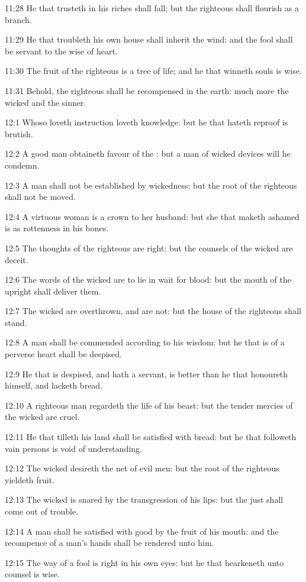 11:28 He that trusteth in his riches shall fall; but the righteous
shall flourish as a branch.

11:29 He that troubleth his own house shall inherit the wind: and the
fool shall be servant to the wise of heart.

11:30 The fruit of the righteous is a tree of life; and he that
winneth souls is wise.

11:31 Behold, the righteous shall be recompensed in the earth: much
more the wicked and the sinner.

12:1 Whoso loveth instruction loveth knowledge: but he that hateth
reproof is brutish.

12:2 A good man obtaineth favour of the \LORD: but a man of wicked
devices will he condemn.

12:3 A man shall not be established by wickedness: but the root of the
righteous shall not be moved.

12:4 A virtuous woman is a crown to her husband: but she that maketh
ashamed is as rottenness in his bones.

12:5 The thoughts of the righteous are right: but the counsels of the
wicked are deceit.

12:6 The words of the wicked are to lie in wait for blood: but the
mouth of the upright shall deliver them.

12:7 The wicked are overthrown, and are not: but the house of the
righteous shall stand.

12:8 A man shall be commended according to his wisdom: but he that is
of a perverse heart shall be despised.

12:9 He that is despised, and hath a servant, is better than he that
honoureth himself, and lacketh bread.

12:10 A righteous man regardeth the life of his beast: but the tender
mercies of the wicked are cruel.

12:11 He that tilleth his land shall be satisfied with bread: but he
that followeth vain persons is void of understanding.

12:12 The wicked desireth the net of evil men: but the root of the
righteous yieldeth fruit.

12:13 The wicked is snared by the transgression of his lips: but the
just shall come out of trouble.

12:14 A man shall be satisfied with good by the fruit of his mouth:
and the recompence of a man's hands shall be rendered unto him.

12:15 The way of a fool is right in his own eyes: but he that
hearkeneth unto counsel is wise.

